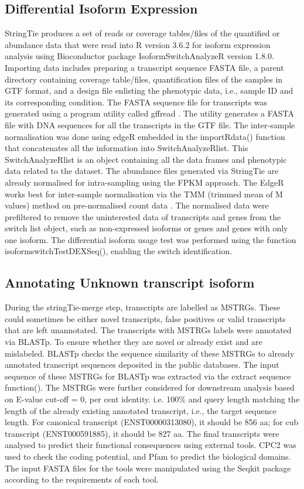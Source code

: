 \documentclass[fleqn,10pt,lineno]{wlpeerj}
\begin{document}
\subsection*{Differential Isoform Expression}
StringTie produces a set of reads or coverage tables/files of the quantified or abundance data that were read into R version 3.6.2 for isoform expression analysis using Bioconductor package IsoformSwitchAnalyzeR version 1.8.0. Importing data includes preparing a transcript sequence FASTA file, a parent directory containing coverage table/files, quantification files of the samples in GTF format, and a design file enlisting the phenotypic data, i.e., sample ID and its corresponding condition. The FASTA sequence file for transcripts was generated using a program utility called gffread \citep{Pertea2020}. The utility generates a FASTA file with DNA sequences for all the transcripts in the GTF file. The inter-sample normalisation was done using edgeR embedded in the importRdata() function that concatenates all the information into SwitchAnalyzeRlist. This SwitchAnalyzeRlist is an object containing all the data frames and phenotypic data related to the dataset. The abundance files generated via StringTie are already normalised for intra-sampling using the FPKM approach. The EdgeR works best for inter-sample normalisation via the TMM (trimmed mean of M values) method on pre-normalised count data \citep{Maza2016}. The normalised data were prefiltered to remove the uninterested data of transcripts and genes from the switch list object, such as non-expressed isoforms or genes and genes with only one isoform. The differential isoform usage test was performed using the function isoformswitchTestDEXSeq(), enabling the switch identification.

\subsection*{Annotating Unknown transcript isoform}
During the stringTie-merge step, transcripts are labelled as MSTRGs. These could sometimes be either novel transcripts, false positives or valid transcripts that are left unannotated. The transcripts with MSTRGs labels were annotated via BLASTp. To ensure whether they are novel or already exist and are mislabeled. BLASTp checks the sequence similarity of these MSTRGs to already annotated transcript sequences deposited in the public databases. The input sequence of these MSTRGs for BLASTp was extracted via the extract sequence function(). The MSTRGs were further considered for downstream analysis based on E-value cut-off = 0, per cent identity. i.e. 100\% and query length matching the length of the already existing annotated transcript, i.e., the target sequence length. For canonical transcript (ENST00000313080), it should be 856 aa; for cub transcript (ENST000591885), it should be 827 aa. The final transcripts were analysed to predict their functional consequences using external tools. CPC2 \citep{Kang2017} was used to check the coding potential, and Pfam \citep{Punta2012, Finn2016} to predict the biological domains. The input FASTA files for the tools were manipulated using the Seqkit \citep{Shen2016} package according to the requirements of each tool.
\end{document}
